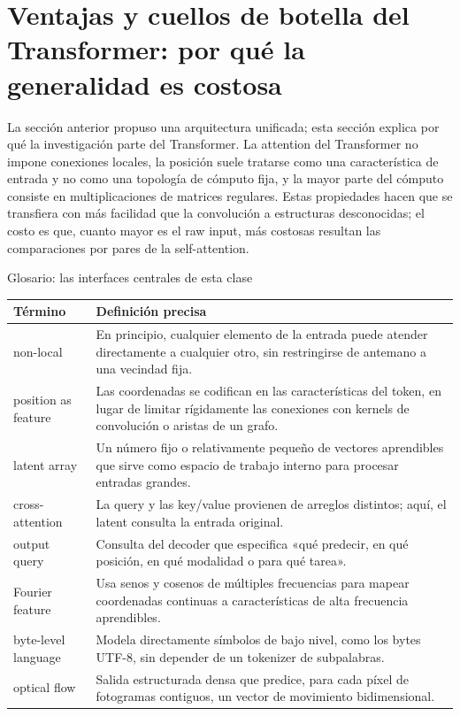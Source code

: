 \section{Ventajas y cuellos de botella del Transformer: por qué la generalidad es costosa}

La sección anterior propuso una arquitectura unificada; esta sección explica por qué la investigación parte del Transformer. La attention del Transformer no impone conexiones locales, la posición suele tratarse como una característica de entrada y no como una topología de cómputo fija, y la mayor parte del cómputo consiste en multiplicaciones de matrices regulares. Estas propiedades hacen que se transfiera con más facilidad que la convolución a estructuras desconocidas; el costo es que, cuanto mayor es el raw input, más costosas resultan las comparaciones por pares de la self-attention.


\begin{knowledgebox}{Glosario: las interfaces centrales de esta clase}
\begin{tabularx}{\textwidth}{L{0.23\textwidth}X}
\toprule
Término & Definición precisa \\
\midrule
non-local & En principio, cualquier elemento de la entrada puede atender directamente a cualquier otro, sin restringirse de antemano a una vecindad fija. \\
position as feature & Las coordenadas se codifican en las características del token, en lugar de limitar rígidamente las conexiones con kernels de convolución o aristas de un grafo. \\
latent array & Un número fijo o relativamente pequeño de vectores aprendibles que sirve como espacio de trabajo interno para procesar entradas grandes. \\
cross-attention & La query y las key/value provienen de arreglos distintos; aquí, el latent consulta la entrada original. \\
output query & Consulta del decoder que especifica «qué predecir, en qué posición, en qué modalidad o para qué tarea». \\
Fourier feature & Usa senos y cosenos de múltiples frecuencias para mapear coordenadas continuas a características de alta frecuencia aprendibles. \\
byte-level language & Modela directamente símbolos de bajo nivel, como los bytes UTF-8, sin depender de un tokenizer de subpalabras. \\
optical flow & Salida estructurada densa que predice, para cada píxel de fotogramas contiguos, un vector de movimiento bidimensional. \\
\bottomrule
\end{tabularx}
\end{knowledgebox}

